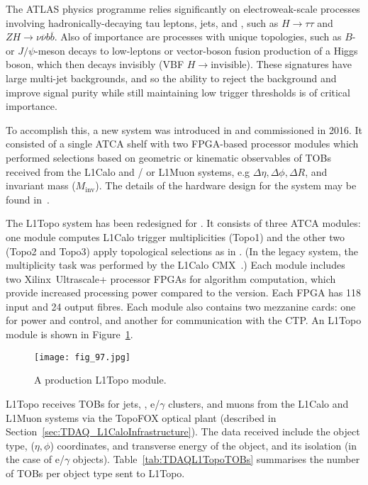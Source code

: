 \documentclass[cernpreprint, atlasdraft=false, UKenglish,british,orcidlogo, texmf, orcidlogo]{atlasdoc}
\begin{document}
The ATLAS physics programme relies significantly on electroweak-scale processes involving hadronically-decaying tau leptons, jets, and \MET, such as $H \rightarrow \tau\tau$ and $ZH \rightarrow \nu\overline{\nu}b\overline{b}$.  Also of importance are processes with unique topologies, such as $B$- or $J/\psi$-meson decays to low-\pT leptons or vector-boson fusion production of a Higgs boson, which then decays invisibly (\gls{VBF} $H \rightarrow \mathrm{invisible}$).  These signatures have large multi-jet backgrounds, and so the ability to reject the background and improve signal purity while still maintaining low trigger thresholds is of critical importance.
 
To accomplish this, a new  system was introduced in \RunTwo and commissioned in 2016.  It consisted of a single \gls{ATCA} shelf with two \gls{FPGA}-based processor modules which performed selections based on geometric or kinematic observables of \glspl{TOB} received from the \gls{L1Calo} and / or \gls{L1Muon} systems, e.g $\Delta\eta, \Delta\phi, \Delta R$, and invariant mass ($M_{\mathrm{inv}}$).  The details of the hardware design for the \RunTwo system may be found in~\cite{TRIG-2019-02}.
 
The \gls{L1Topo} system has been redesigned for \RunThr.
It consists of three \gls{ATCA} modules: one module computes \gls{L1Calo} trigger multiplicities (Topo1)  and the other two (Topo2 and Topo3)  apply topological selections as in \RunTwo.
(In the legacy system, the multiplicity task was performed by the \gls{L1Calo} \gls{CMX}~\cite{TRIG-2016-01}.)
Each module includes two Xilinx\textregistered~Ultrascale+ processor \glspl{FPGA} for algorithm computation, which provide increased processing power compared to the \RunTwo version.  Each \gls{FPGA} has 118 input and 24 output fibres.  Each module also contains two mezzanine cards: one for power and control, and another for communication with the \gls{CTP}.  An \gls{L1Topo} module is shown in Figure~\ref{fig:TDAQL1TopoPhoto}.
 
\begin{figure}[htbp]
\centerline{\texttt{[image: fig\_97.jpg]}}
\caption{A production \gls{L1Topo} module.}
\label{fig:TDAQL1TopoPhoto}
\end{figure}
 
\gls{L1Topo} receives \glspl{TOB} for jets, \MET,  e/$\gamma$ clusters, and muons from the \gls{L1Calo} and \gls{L1Muon} systems via the TopoFOX optical plant (described in Section~\ref{sec:TDAQ_L1CaloInfrastructure}).  The data received include the object type, ($\eta, \phi$) coordinates, and transverse energy of the object, and its isolation (in the case of e/$\gamma$ objects).  Table~\ref{tab:TDAQL1TopoTOBs} summarises the number of \glspl{TOB} per object type sent to \gls{L1Topo}.
 
\end{document}
